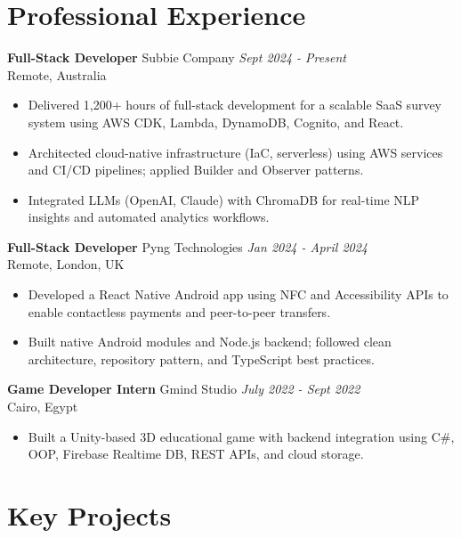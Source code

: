 \documentclass[8pt,a4paper]{article}
\newcommand{\cventry}[4]{%
    \textbf{#1} \hfill {\small\color{secondarycolor} #2} \hfill {\footnotesize\textit{#3}}\\
    #4
    \vspace{0.02em}
}
\begin{document}


\section{Professional Experience}

\cventry{Full-Stack Developer}{Subbie Company}{Sept 2024 - Present}{Remote, Australia}{}{
\begin{itemize}
    \item Delivered 1,200+ hours of full-stack development for a scalable SaaS survey system using AWS CDK, Lambda, DynamoDB, Cognito, and React.
    \item Architected cloud-native infrastructure (IaC, serverless) using AWS services and CI/CD pipelines; applied Builder and Observer patterns.
    \item Integrated LLMs (OpenAI, Claude) with ChromaDB for real-time NLP insights and automated analytics workflows.
\end{itemize}
}

\cventry{Full-Stack Developer}{Pyng Technologies}{Jan 2024 - April 2024}{Remote, London, UK}
\begin{itemize}
    \item Developed a React Native Android app using NFC and Accessibility APIs to enable contactless payments and peer-to-peer transfers.
    \item Built native Android modules and Node.js backend; followed clean architecture, repository pattern, and TypeScript best practices.
\end{itemize}

\cventry{Game Developer Intern}{Gmind Studio}{July 2022 - Sept 2022}{Cairo, Egypt}{}{
\begin{itemize}
    \item Built a Unity-based 3D educational game with backend integration using C\#, OOP, Firebase Realtime DB, REST APIs, and cloud storage.
\end{itemize}
}


\section{Key Projects}
\end{document}
